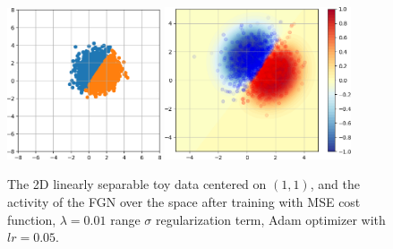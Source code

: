 \documentclass[12pt,oneside]{CUNY_PhD}
\begin{document}
\begin{figure}[!htbp]
    \centering
    \hspace{0.0\textwidth}
    \includegraphics[width=0.405\textwidth]{images/2D-single-neuron/2d-easy-data-cropped.png}
    \hspace{0.04\textwidth}
    \includegraphics[width=0.49\textwidth]{images/2D-single-neuron/2d-easy-trained-activity-cropped.png}
    \caption{The 2D linearly separable toy data centered on $(1,1)$, and the activity of the FGN over the space after training with MSE cost function, $\lambda=0.01$ range $\sigma$ regularization term, Adam optimizer with $lr=0.05$.}
    \label{fig:single-fgn-1}
\end{figure}
\end{document}
